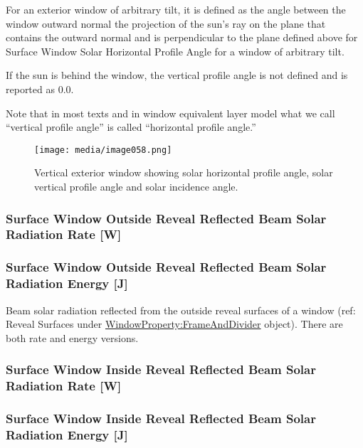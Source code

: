 For an exterior window of arbitrary tilt, it is defined as the angle between the window outward normal the projection of the sun's ray on the plane that contains the outward normal and is perpendicular to the plane defined above for Surface Window Solar Horizontal Profile Angle for a window of arbitrary tilt.

If the sun is behind the window, the vertical profile angle is not defined and is reported as 0.0.

Note that in most texts and in window equivalent layer model what we call ``vertical profile angle'' is called ``horizontal profile angle.''

\begin{figure}[hbtp] %
\centering
\texttt{[image: media/image058.png]}
\caption{Vertical exterior window showing solar horizontal profile angle, solar vertical profile angle and solar incidence angle. \protect \label{fig:vertical-exterior-window-showing-solar}}
\end{figure}

\subsubsection{Surface Window Outside Reveal Reflected Beam Solar Radiation Rate {[}W{]}}\label{surface-window-outside-reveal-reflected-beam-solar-radiation-rate-w}

\subsubsection{Surface Window Outside Reveal Reflected Beam Solar Radiation Energy {[}J{]}}\label{surface-window-outside-reveal-reflected-beam-solar-radiation-energy-j}

Beam solar radiation reflected from the outside reveal surfaces of a window (ref: Reveal Surfaces under \hyperref[windowpropertyframeanddivider]{WindowProperty:FrameAndDivider} object). There are both rate and energy versions.

\subsubsection{Surface Window Inside Reveal Reflected Beam Solar Radiation Rate {[}W{]}}\label{surface-window-inside-reveal-reflected-beam-solar-radiation-rate-w}

\subsubsection{Surface Window Inside Reveal Reflected Beam Solar Radiation Energy {[}J{]}}\label{surface-window-inside-reveal-reflected-beam-solar-radiation-energy-j}


